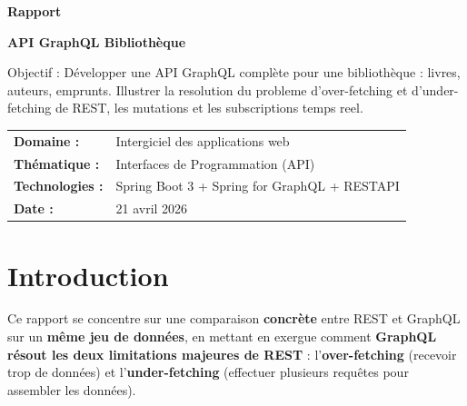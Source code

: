 \documentclass[12pt,a4paper]{article}
\begin{document}
\begin{titlepage}
    \centering
    \vspace*{2cm}

    {\Huge\bfseries\textcolor{primaryblue}{Rapport}\par}
    \vspace{0.5cm}
    {\Huge\bfseries\textcolor{primaryblue}{API GraphQL Bibliothèque}\par}
 
    \vspace{1.5cm}

    \begin{tcolorbox}[
        colback=lightgray,
        colframe=primaryblue,
        width=0.85\textwidth,
        arc=3mm,
        boxrule=1pt
    ]
    \centering
    \large
    Objectif : Développer une API GraphQL complète pour une bibliothèque : livres, 
    auteurs, emprunts. Illustrer la resolution du probleme d'over-fetching et d'under-
    fetching de REST, les mutations et les subscriptions temps reel.
    \end{tcolorbox}

    \vspace{2cm}

    \begin{tabular}{ll}
        \textbf{Domaine :} & Intergiciel des applications web\\[0.3cm]
        \textbf{Thématique :} & Interfaces de Programmation (API) \\[0.3cm]
        \textbf{Technologies :} & Spring Boot 3 + Spring for GraphQL + RESTAPI  \\[0.3cm]
        \textbf{Date :} & 21 avril 2026
    \end{tabular}
\end{titlepage}

\tableofcontents
\newpage
\section{Introduction}
\begin{infobox}[title={Problématique centrale}]
Ce rapport se concentre sur une comparaison \textbf{concrète} entre REST et GraphQL sur un \textbf{même jeu de données}, en mettant en exergue comment \textbf{GraphQL résout les deux limitations majeures de REST} : l'\textbf{over-fetching} (recevoir trop de données) et l'\textbf{under-fetching} (effectuer plusieurs requêtes pour assembler les données).
\end{infobox}
\newpage
\end{document}
